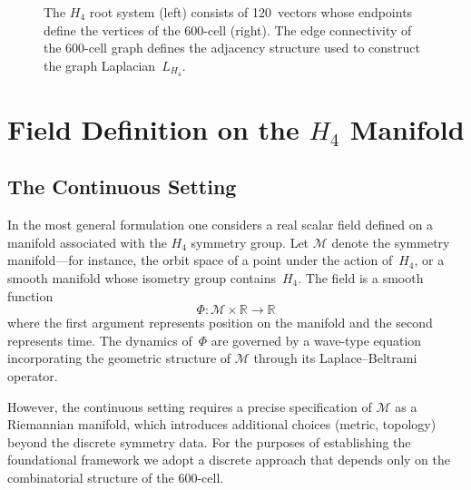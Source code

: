 \documentclass[12pt,a4paper]{article}
\newcommand{\Hfour}{H_4}
\newcommand{\Lmat}{L_{H_4}}
\newcommand{\R}{\mathbb{R}}
\begin{document}
\begin{figure}[H]
\caption{The $\Hfour$ root system (left) consists of 120~vectors whose
endpoints define the vertices of the 600-cell (right).  The edge connectivity
of the 600-cell graph defines the adjacency structure used to construct the
graph Laplacian~$\Lmat$.}
\label{fig:h4roots}
\end{figure}


\section{Field Definition on the \texorpdfstring{$\Hfour$}{H4} Manifold}
\label{sec:field}

\subsection{The Continuous Setting}

In the most general formulation one considers a real scalar field defined on a
manifold associated with the $\Hfour$ symmetry group.  Let $\mathcal{M}$
denote the symmetry manifold---for instance, the orbit space of a point under
the action of~$\Hfour$, or a smooth manifold whose isometry group
contains~$\Hfour$.  The field is a smooth function
\begin{equation}\label{eq:field_cont}
  \Phi : \mathcal{M} \times \R \longrightarrow \R
\end{equation}
where the first argument represents position on the manifold and the second
represents time.  The dynamics of~$\Phi$ are governed by a wave-type equation
incorporating the geometric structure of $\mathcal{M}$ through its
Laplace--Beltrami operator.

However, the continuous setting requires a precise specification of
$\mathcal{M}$ as a Riemannian manifold, which introduces additional choices
(metric, topology) beyond the discrete symmetry data.  For the purposes of
establishing the foundational framework we adopt a discrete approach that
depends only on the combinatorial structure of the 600-cell.
\end{document}
